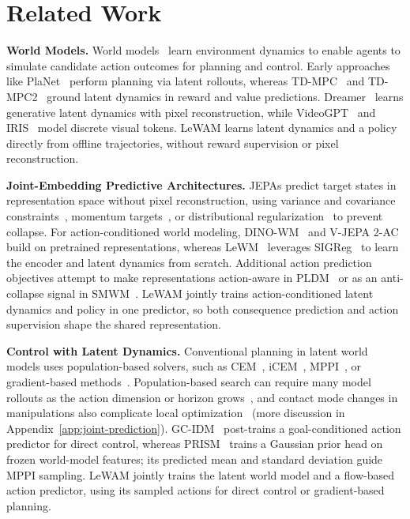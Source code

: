 \documentclass{article} %
\newcommand{\methodname}[1]{\textup{#1}}
\newcommand{\method}{\methodname{LeWAM}}
\newcommand{\lead}[1]{\textbf{#1}}
\begin{document}
\section{Related Work}
\label{sec:related}
\lead{World Models.} World models~\citep{ha2018worldmodels} learn environment dynamics to enable agents to simulate candidate action outcomes for planning and control. Early approaches like \methodname{PlaNet}~\citep{hafner2019planet} perform planning via latent rollouts, whereas \methodname{TD-MPC}~\citep{hansen2022tdmpc} and \methodname{TD-MPC2}~\citep{hansen2024tdmpc2} ground latent dynamics in reward and value predictions. \methodname{Dreamer}~\citep{hafner2020dreamer,hafner2023dreamerv3} learns generative latent dynamics with pixel reconstruction, while \methodname{VideoGPT}~\citep{yan2021videogpt} and \methodname{IRIS}~\citep{micheli2023iris} model discrete visual tokens. \method{} learns latent dynamics and a policy directly from offline trajectories, without reward supervision or pixel reconstruction.

\lead{Joint-Embedding Predictive Architectures.} JEPAs predict target states in representation space without pixel
reconstruction, using variance and covariance constraints~\citep{bardes2022vicreg}, momentum
targets~\citep{assran2023ijepa,bardes2024vjepa}, or distributional
regularization~\citep{balestriero2025lejepa,wu2026visreg} to prevent collapse.
For action-conditioned world modeling,
\methodname{DINO-WM}~\citep{zhou2024dinowm} and \methodname{V-JEPA 2-AC}~\citep{assran2025vjepa2}
build on pretrained representations, whereas \methodname{LeWM}~\citep{maes2026lewm} leverages
SIGReg~\citep{balestriero2025lejepa} to learn the encoder and latent dynamics from scratch.
Additional action prediction objectives attempt to make representations action-aware in \methodname{PLDM}~\citep{sobal2025pldm} or as an anti-collapse signal in
\methodname{SMWM}~\citep{ivashkov2026smwm}. \method{} jointly trains action-conditioned latent
dynamics and policy in one predictor, so both consequence prediction and action supervision
shape the shared representation.

\lead{Control with Latent Dynamics.} Conventional planning in latent world models uses population-based solvers, such as CEM~\citep{rubinstein1999cem}, iCEM~\citep{pinneri2021icem}, MPPI~\citep{williams2017mppi}, or gradient-based methods~\citep{henaff2017discrete,huang2021cemgd}. Population-based search can require many model rollouts as the action dimension or horizon grows~\citep{pinneri2021icem,huang2021cemgd}, and contact mode changes in manipulations also complicate local optimization~\citep{pang2023contactplanning} (more discussion in Appendix~\ref{app:joint-prediction}). \methodname{GC-IDM}~\citep{nguyen2026gcidm} post-trains a goal-conditioned action predictor for direct control, whereas \methodname{PRISM}~\citep{wang2026prism} trains a Gaussian prior head on frozen world-model features; its predicted mean and standard deviation guide MPPI sampling. \method{} jointly trains the latent world model and a flow-based action predictor, using its sampled actions for direct control or gradient-based planning.
\end{document}
